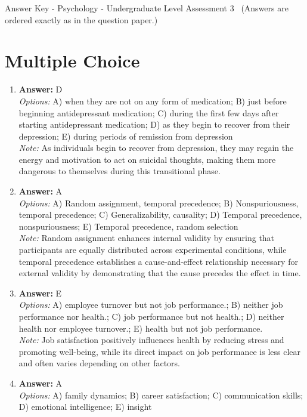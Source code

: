 \documentclass[12pt]{article}
\begin{document}
\begin{center}
Answer Key - Psychology - Undergraduate Level Assessment 3 \
\small (Answers are ordered exactly as in the question paper.)
\end{center}

\section*{Multiple Choice}
\begin{enumerate}[label=\arabic*.]
\item \textbf{Answer:} D
\\ \textit{Options:} A) when they are not on any form of medication; B) just before beginning antidepressant medication; C) during the first few days after starting antidepressant medication; D) as they begin to recover from their depression; E) during periods of remission from depression
\\ \textit{Note:} As individuals begin to recover from depression, they may regain the energy and motivation to act on suicidal thoughts, making them more dangerous to themselves during this transitional phase.
\item \textbf{Answer:} A
\\ \textit{Options:} A) Random assignment, temporal precedence; B) Nonspuriousness, temporal precedence; C) Generalizability, causality; D) Temporal precedence, nonspuriousness; E) Temporal precedence, random selection
\\ \textit{Note:} Random assignment enhances internal validity by ensuring that participants are equally distributed across experimental conditions, while temporal precedence establishes a cause-and-effect relationship necessary for external validity by demonstrating that the cause precedes the effect in time.
\item \textbf{Answer:} E
\\ \textit{Options:} A) employee turnover but not job performance.; B) neither job performance nor health.; C) job performance but not health.; D) neither health nor employee turnover.; E) health but not job performance.
\\ \textit{Note:} Job satisfaction positively influences health by reducing stress and promoting well-being, while its direct impact on job performance is less clear and often varies depending on other factors.
\item \textbf{Answer:} A
\\ \textit{Options:} A) family dynamics; B) career satisfaction; C) communication skills; D) emotional intelligence; E) insight

\end{enumerate}
\end{document}
